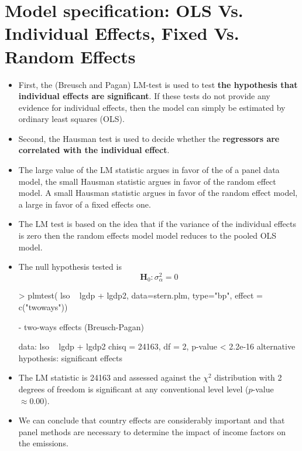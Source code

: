 \documentclass[landscape,letterpaper,9pt]{article}
\newcommand\cbox[1]{\colorbox{darkyellow}{#1}}
\begin{document}
\section{Model specification: OLS Vs. Individual Effects, Fixed Vs. Random Effects}
\begin{itemize}
\item 
 First, the (Breusch and Pagan) \cbox{LM-test} is used to test \textbf{the hypothesis that individual effects are significant}.
 If these tests do not provide any evidence for individual effects,
 then the model can simply be estimated by ordinary least squares (OLS).

\item 
 Second, the \cbox{Hausman test} is used to decide whether the \textbf{regressors are correlated with the
 individual effect}.

\item 
The large value of the LM statistic argues in favor of the of a panel data model, the small Hausman
statistic argues in favor of the random effect model. A small Hausman
statistic argues in favor of the random effect model, a large in favor of a fixed effects one.
\end{itemize}
\newpage
\begin{itemize}
\item 
The \cbox{LM test} is based on the idea that if the variance
of the individual effects
is zero then the random effects model model reduces to the pooled OLS model.
\item The null  \cbox{hypothesis} tested is
 $$\mathbf{H}_0\!\!:  \sigma_\alpha^2 = 0$$
 \vspace{.1in}
\begin{CVerbatim}
> plmtest(  lso ~ lgdp  + lgdp2, data=stern.plm, type="bp", effect = c("twoways"))

        \fbox{\textcolor{red}{Lagrange Multiplier Test}} - two-ways effects (Breusch-Pagan)

data:  lso ~ lgdp + lgdp2
chisq = 24163, df = 2, p-value < 2.2e-16
alternative hypothesis: significant effects 
\end{CVerbatim}
\vspace{.1in}
\item The LM statistic is  24163 and assessed against the
\(\chi^2\) distribution with 2 degrees of freedom is  
significant at any conventional level level ($p$-value $\approx 0.00$).
\item We can conclude that country effects  are considerably important and that \cbox{panel methods} are
necessary to determine the impact of income factors on the emissions.
\end{itemize}
\end{document}
